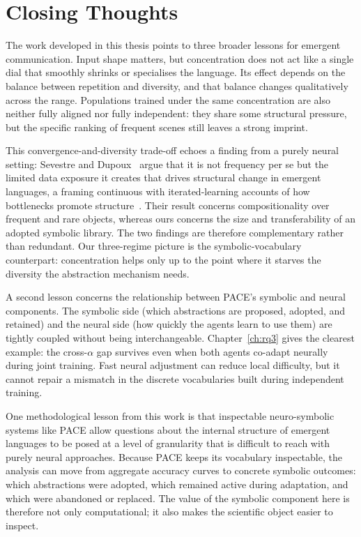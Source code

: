 \section{Closing Thoughts}
\label{sec:closing-thoughts}

The work developed in this thesis points to three broader lessons for emergent communication. Input shape matters, but concentration does not act like a single dial that smoothly shrinks or specialises the language. Its effect depends on the balance between repetition and diversity, and that balance changes qualitatively across the range. Populations trained under the same concentration are also neither fully aligned nor fully independent: they share some structural pressure, but the specific ranking of frequent scenes still leaves a strong imprint.

This convergence-and-diversity trade-off echoes a finding from a purely neural setting: Sevestre and Dupoux~\cite{sevestre_frequency_2025} argue that it is not frequency per se but the limited data exposure it creates that drives structural change in emergent languages, a framing continuous with iterated-learning accounts of how bottlenecks promote structure~\cite{kirby_spontaneous_2001}. Their result concerns compositionality over frequent and rare objects, whereas ours concerns the size and transferability of an adopted symbolic library. The two findings are therefore complementary rather than redundant. Our three-regime picture is the symbolic-vocabulary counterpart: concentration helps only up to the point where it starves the diversity the abstraction mechanism needs.

A second lesson concerns the relationship between PACE's symbolic and neural components. The symbolic side (which abstractions are proposed, adopted, and retained) and the neural side (how quickly the agents learn to use them) are tightly coupled without being interchangeable. Chapter~\ref{ch:rq3} gives the clearest example: the cross-$\alpha$ gap survives even when both agents co-adapt neurally during joint training. Fast neural adjustment can reduce local difficulty, but it cannot repair a mismatch in the discrete vocabularies built during independent training.

One methodological lesson from this work is that inspectable neuro-symbolic systems like PACE allow questions about the internal structure of emergent languages to be posed at a level of granularity that is difficult to reach with purely neural approaches. Because PACE keeps its vocabulary inspectable, the analysis can move from aggregate accuracy curves to concrete symbolic outcomes: which abstractions were adopted, which remained active during adaptation, and which were abandoned or replaced. The value of the symbolic component here is therefore not only computational; it also makes the scientific object easier to inspect.

